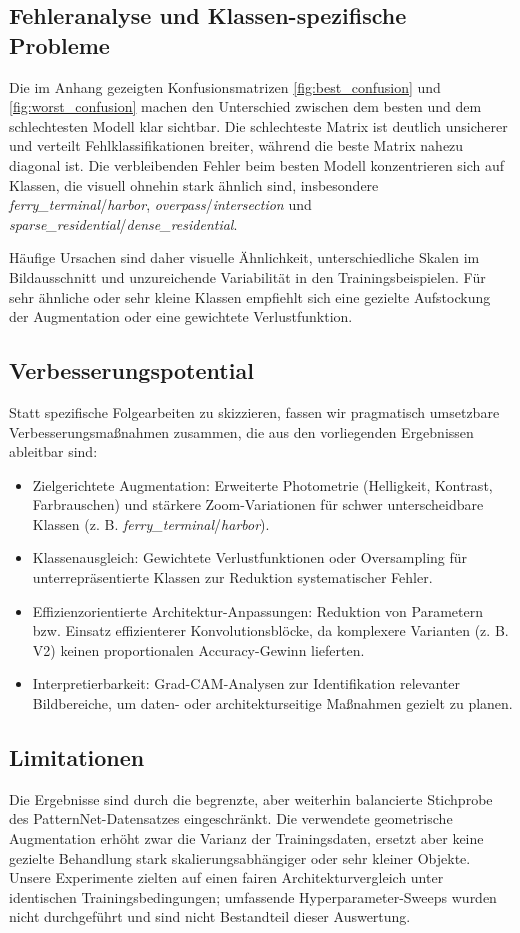 \subsection{Fehleranalyse und Klassen-spezifische Probleme}
Die im Anhang gezeigten Konfusionsmatrizen \ref{fig:best_confusion} und
\ref{fig:worst_confusion} machen den Unterschied zwischen dem besten und dem
schlechtesten Modell klar sichtbar. Die schlechteste Matrix ist deutlich
unsicherer und verteilt Fehlklassifikationen breiter, während die beste Matrix
nahezu diagonal ist. Die verbleibenden Fehler beim besten Modell konzentrieren
sich auf Klassen, die visuell ohnehin stark ähnlich sind, insbesondere
\emph{ferry\_terminal}/\emph{harbor}, \emph{overpass}/\emph{intersection}
und \emph{sparse\_residential}/\emph{dense\_residential}.

Häufige Ursachen sind daher visuelle Ähnlichkeit, unterschiedliche Skalen im
Bildausschnitt und unzureichende Variabilität in den Trainingsbeispielen.
Für sehr ähnliche oder sehr kleine Klassen empfiehlt sich eine gezielte
Aufstockung der Augmentation oder eine gewichtete Verlustfunktion.

\subsection{Verbesserungspotential}
Statt spezifische Folgearbeiten zu skizzieren, fassen wir pragmatisch umsetzbare
Verbesserungsmaßnahmen zusammen, die aus den vorliegenden Ergebnissen
ableitbar sind:
\begin{itemize}
    \item Zielgerichtete Augmentation: Erweiterte Photometrie (Helligkeit,
          Kontrast, Farbrauschen) und stärkere Zoom-Variationen für schwer
          unterscheidbare Klassen (z. B. \emph{ferry\_terminal}/\emph{harbor}).
    \item Klassenausgleich: Gewichtete Verlustfunktionen oder Oversampling für
          unterrepräsentierte Klassen zur Reduktion systematischer Fehler.
    \item Effizienzorientierte Architektur-Anpassungen: Reduktion von
          Parametern bzw. Einsatz effizienterer Konvolutionsblöcke, da
          komplexere Varianten (z. B. V2) keinen proportionalen Accuracy-Gewinn
          lieferten.
    \item Interpretierbarkeit: Grad-CAM-Analysen zur Identifikation relevanter
          Bildbereiche, um daten- oder architekturseitige Maßnahmen gezielt zu
          planen.
\end{itemize}

\subsection{Limitationen}
Die Ergebnisse sind durch die begrenzte, aber weiterhin balancierte
Stichprobe des PatternNet-Datensatzes eingeschränkt. Die verwendete
geometrische Augmentation erhöht zwar die Varianz der Trainingsdaten, ersetzt
aber keine gezielte Behandlung stark skalierungsabhängiger oder sehr kleiner
Objekte. Unsere Experimente zielten auf einen fairen Architekturvergleich
unter identischen Trainingsbedingungen; umfassende Hyperparameter-Sweeps
wurden nicht durchgeführt und sind nicht Bestandteil dieser Auswertung.
